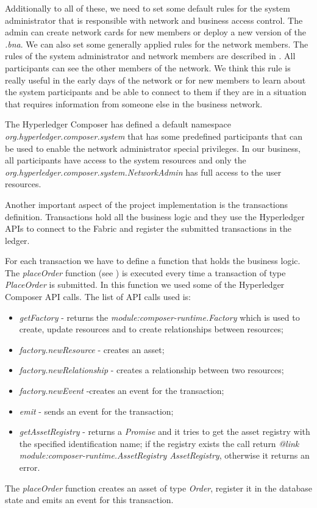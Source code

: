 
Additionally to all of these, we need to set some default rules for the system administrator that is responsible with network and business access control.  The admin can create network cards for new members or deploy a new version of the \emph{.bna}. We can also set some generally applied rules for the network members. The rules of the system administrator and network members are described in . All participants can see the other members of the network. We think this rule is really useful in the early days of the network or for new members to learn about the system participants and be able to connect to them if they are in a situation that requires information from someone else in the business network. 

The Hyperledger Composer has defined a default namespace \emph{org.hyperledger.composer.system} that has some predefined participants that can be used to enable the network administrator special privileges. In our business, all participants have access to the system resources and only the \emph{org.hyperledger.composer.system.NetworkAdmin} has full access to the user resources.

Another important aspect of the project implementation is the transactions definition. Transactions hold all the business logic and they use the Hyperledger APIs to connect to the Fabric and register the submitted transactions in the ledger.

For each transaction we have to define a function that holds the business logic.
The \emph{placeOrder} function (see ) is executed every time a transaction of type \emph{PlaceOrder} is submitted. In this function we used some of the Hyperledger Composer API calls.
The list of API calls used is:
\begin{itemize}
	\item \emph{getFactory} - returns the \emph{module:composer-runtime.Factory} which is used to create, update resources and to create relationships between resources;
	\item \emph{factory.newResource} - creates an asset;
	\item \emph{factory.newRelationship} - creates a relationship between two resources;
	\item \emph{factory.newEvent} -creates an event for the transaction;
	\item \emph{emit} - sends an event for the transaction;
	\item \emph{getAssetRegistry} - returns a \emph{Promise} and it tries to get the asset registry with the specified identification name; if the registry exists the call return \emph{@link module:composer-runtime.AssetRegistry AssetRegistry}, otherwise it returns an error.
\end{itemize}
The \emph{placeOrder} function creates an asset of type \emph{Order}, register it in the database state and emits an event for this transaction.


